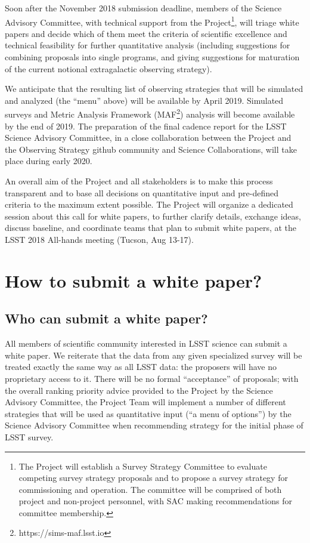 \documentclass[DM,lsstdraft,toc,usenatbib]{lsstdoc}
\begin{document}
Soon after the November 2018 submission deadline, members of the Science Advisory 
Committee, with technical support from the Project\footnote{The Project will establish a Survey 
Strategy Committee to evaluate competing survey strategy proposals and to propose a survey 
strategy for commissioning and operation. The committee will be comprised of both project and 
non-project personnel, with SAC making recommendations for committee membership.}, will 
triage white papers and decide which of them meet the criteria of scientific excellence and 
technical feasibility for further quantitative analysis (including suggestions for combining 
proposals into single programs, and giving suggestions for maturation of the current notional 
extragalactic observing strategy). 

We anticipate that the resulting list of observing strategies that will be simulated and analyzed 
(the ``menu'' above) will be available by April 2019. Simulated surveys and Metric Analysis 
Framework (MAF\footnote{https://sims-maf.lsst.io}) analysis will become available by the end 
of 2019. The preparation of the final cadence report for the LSST Science Advisory Committee, 
in a close collaboration between the Project and the Observing Strategy github community and 
Science Collaborations, will take place during early 2020.  

An overall aim of the Project and all stakeholders is to make this process transparent and to base 
all decisions on quantitative input and pre-defined criteria to the maximum extent possible. 
The Project will organize a dedicated session about this call for white papers, to further clarify 
details, exchange ideas, discuss baseline, and coordinate teams that plan to submit white papers,
at the LSST 2018 All-hands meeting (Tucson, Aug 13-17). 


\section{How to submit a white paper?} 


\subsection{Who can submit a white paper?} 

All members of scientific community interested in LSST science can submit a white paper. 
We reiterate that the data from any given specialized survey will be treated exactly the same 
way as all LSST data: the proposers will have no proprietary access to it. There will be no 
formal ``acceptance'' of proposals; with the overall ranking priority advice provided to the 
Project by the Science Advisory Committee, the Project Team will implement a number of
different strategies that will be used as quantitative input (``a menu of options'') by the 
Science Advisory Committee when recommending strategy for the initial phase of LSST survey. 
\end{document}
